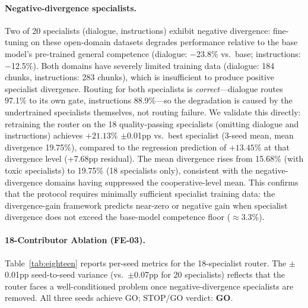\documentclass{article}
\begin{document}
\paragraph{Negative-divergence specialists.}
Two of 20 specialists (dialogue, instructions) exhibit negative divergence: fine-tuning on
these open-domain datasets degrades performance relative to the base model's pre-trained
general competence (dialogue: $-$23.8\% vs.\ base; instructions: $-$12.5\%).
Both domains have severely limited training data (dialogue: 184 chunks, instructions: 283
chunks), which is insufficient to produce positive specialist divergence.
Routing for both specialists is \emph{correct}---dialogue routes 97.1\% to its own gate,
instructions 88.9\%---so the degradation is caused by the undertrained specialists
themselves, not routing failure.
We validate this directly: retraining the router on the 18 quality-passing specialists (omitting dialogue and instructions) achieves $\mathbf{+21.13\%}$ $\pm$0.01pp vs.\ best specialist (3-seed mean, mean divergence 19.75\%), compared to the regression prediction of $+13.45\%$ at that divergence level (+7.68pp residual).
The mean divergence rises from 15.68\% (with toxic specialists) to 19.75\% (18 specialists only), consistent with the negative-divergence domains having suppressed the cooperative-level mean.
This confirms that the protocol requires minimally sufficient specialist training data: the divergence-gain framework predicts near-zero or negative gain when specialist divergence does not exceed the base-model competence floor ($\approx$3.3\%).

\paragraph{18-Contributor Ablation (FE-03).}
Table~\ref{tab:eighteen} reports per-seed metrics for the 18-specialist router.
The $\pm$0.01pp seed-to-seed variance (vs.\ $\pm$0.07pp for 20 specialists) reflects that the router faces a
well-conditioned problem once negative-divergence specialists are removed.
All three seeds achieve GO; STOP/GO verdict: \textbf{GO}.
\end{document}
